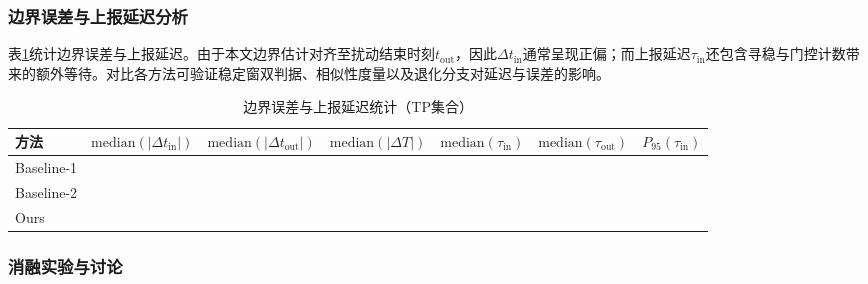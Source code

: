 \documentclass{xdupgthesis}
\begin{document}

\subsubsection{边界误差与上报延迟分析}

表\ref{tab:ch4_timing}统计边界误差与上报延迟。由于本文边界估计对齐至扰动结束时刻$t_{\mathrm{out}}$，因此$\Delta t_{\mathrm{in}}$通常呈现正偏；而上报延迟$\tau_{\mathrm{in}}$还包含寻稳与门控计数带来的额外等待。对比各方法可验证稳定窗双判据、相似性度量以及退化分支对延迟与误差的影响。

\begin{table}[t]
\centering
\caption{边界误差与上报延迟统计（TP集合）}
\label{tab:ch4_timing}
\begin{tabular}{l c c c c c c}
\hline
方法 & $\mathrm{median}(|\Delta t_{\mathrm{in}}|)$ & $\mathrm{median}(|\Delta t_{\mathrm{out}}|)$ &
$\mathrm{median}(|\Delta T|)$ &
$\mathrm{median}(\tau_{\mathrm{in}})$ & $\mathrm{median}(\tau_{\mathrm{out}})$ &
$P_{95}(\tau_{\mathrm{in}})$ \\
\hline
Baseline-1 &  &  &  &  &  &  \\
Baseline-2 &  &  &  &  &  &  \\
Ours       &  &  &  &  &  &  \\
\hline
\end{tabular}
\end{table}

\subsubsection{消融实验与讨论}
\end{document}
